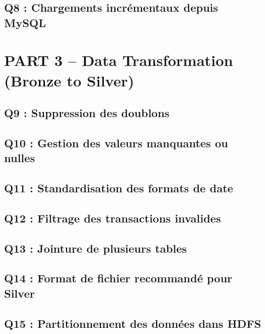 \documentclass{RapportINPTCLOUD}
\begin{document}

\subsection{Q8 : Chargements incr\'{e}mentaux depuis MySQL}


\section{PART 3 -- Data Transformation (Bronze to Silver)}

\subsection{Q9 : Suppression des doublons}


\subsection{Q10 : Gestion des valeurs manquantes ou nulles}


\subsection{Q11 : Standardisation des formats de date}


\subsection{Q12 : Filtrage des transactions invalides}


\subsection{Q13 : Jointure de plusieurs tables}


\subsection{Q14 : Format de fichier recommand\'{e} pour Silver}


\subsection{Q15 : Partitionnement des donn\'{e}es dans HDFS}
\end{document}
